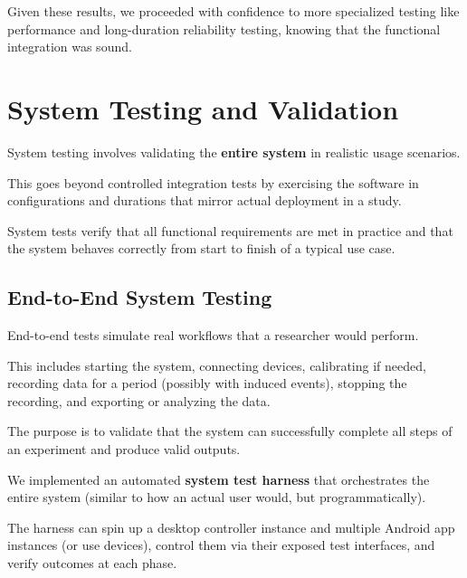 {{{Given these results, we proceeded with confidence to more specialized testing like performance and long-duration reliability testing, knowing that the functional integration was sound.

\section{System Testing and Validation}

System testing involves validating the \textbf{entire system}
 in realistic usage scenarios.

This goes beyond controlled integration tests by exercising the software in configurations and durations that mirror actual deployment in a study.

System tests verify that all functional requirements are met in practice and that the system behaves correctly from start to finish of a typical use case.

\subsection{End-to-End System Testing}

End-to-end tests simulate real workflows that a researcher would perform.

This includes starting the system, connecting devices, calibrating if needed, recording data for a period (possibly with induced events), stopping the recording, and exporting or analyzing the data.

The purpose is to validate that the system can successfully complete all steps of an experiment and produce valid outputs.

We implemented an automated \textbf{system test harness}
 that orchestrates the entire system (similar to how an actual user would, but programmatically).

The harness can spin up a desktop controller instance and multiple Android app instances (or use devices), control them via their exposed test interfaces, and verify outcomes at each phase.

}}}
